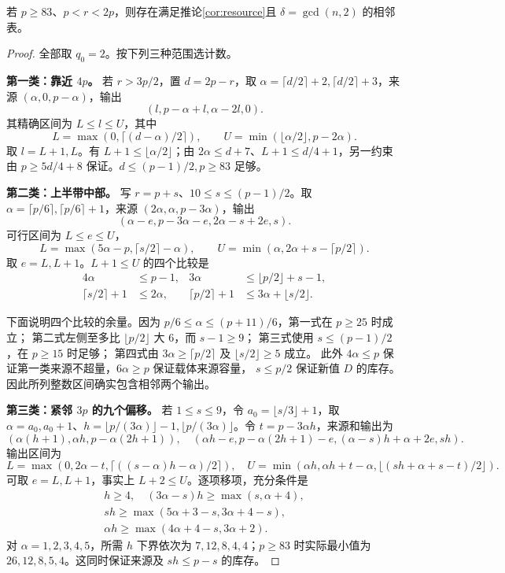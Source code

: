 \begin{lemma}[大素数的三组计数公式]\label{lem:upper-supply}
若 $p\ge83$、$p<r<2p$，则存在满足推论\ref{cor:resource}且 $\delta=\gcd(n,2)$ 的相邻表。
\end{lemma}
\begin{proof}
全部取 $q_0=2$。按下列三种范围选计数。

\par\noindent\textbf{第一类：靠近 $4p$。} 若 $r>3p/2$，置 $d=2p-r$，取 $\alpha=\lceil d/2\rceil+2,\lceil d/2\rceil+3$，来源 $(\alpha,0,p-\alpha)$，输出
\[(l,p-\alpha+l,\alpha-2l,0).
\]
其精确区间为 $L\le l\le U$，其中
\[L=\max(0,\lceil(d-\alpha)/2\rceil),\qquad
U=\min(\lfloor\alpha/2\rfloor,p-2\alpha).
\]
取 $l=L+1,L$。有 $L+1\le\lfloor\alpha/2\rfloor$；由 $2\alpha\le d+7$、$L+1\le d/4+1$，另一约束由 $p\ge5d/4+8$ 保证。$d\le(p-1)/2,p\ge83$ 足够。

\par\noindent\textbf{第二类：上半带中部。} 写 $r=p+s$、$10\le s\le(p-1)/2$。取 $\alpha=\lceil p/6\rceil,\lceil p/6\rceil+1$，来源 $(2\alpha,\alpha,p-3\alpha)$，输出
\[(\alpha-e,p-3\alpha-e,2\alpha-s+2e,s).
\]
可行区间为 $L\le e\le U$，
\[L=\max(5\alpha-p,\lceil s/2\rceil-\alpha),\qquad
U=\min(\alpha,2\alpha+s-\lceil p/2\rceil).
\]
取 $e=L,L+1$。$L+1\le U$ 的四个比较是
\begin{align*}
4\alpha&\le p-1,&3\alpha&\le\lfloor p/2\rfloor+s-1,\\
\lceil s/2\rceil+1&\le2\alpha,&\lceil p/2\rceil+1&\le3\alpha+\lfloor s/2\rfloor.
\end{align*}

下面说明四个比较的余量。因为 $p/6\le\alpha\le(p+11)/6$，第一式在 $p\ge25$ 时成立；
第二式左侧至多比 $\lfloor p/2\rfloor$ 大 $6$，而 $s-1\ge9$；
第三式使用 $s\le(p-1)/2$，在 $p\ge15$ 时足够；
第四式由 $3\alpha\ge\lceil p/2\rceil$ 及 $\lfloor s/2\rfloor\ge5$ 成立。
此外 $4\alpha\le p$ 保证第一类来源不超量，$6\alpha\ge p$ 保证载体来源容量，
$s\le p/2$ 保证新值 $D$ 的库存。因此所列整数区间确实包含相邻两个输出。

\par\noindent\textbf{第三类：紧邻 $3p$ 的九个偏移。} 若 $1\le s\le9$，令 $a_0=\lfloor s/3\rfloor+1$，取 $\alpha=a_0,a_0+1$、$h=\lfloor p/(3\alpha)\rfloor-1,\lfloor p/(3\alpha)\rfloor$。令 $t=p-3\alpha h$，来源和输出为
\[
(\alpha(h+1),\alpha h,p-\alpha(2h+1)),\quad
(\alpha h-e,p-\alpha(2h+1)-e,(\alpha-s)h+\alpha+2e,sh).
\]
输出区间为
\[
L=\max(0,2\alpha-t,\lceil((s-\alpha)h-\alpha)/2\rceil),\quad
U=\min(\alpha h,\alpha h+t-\alpha,\lfloor(sh+\alpha+s-t)/2\rfloor).
\]
可取 $e=L,L+1$，事实上 $L+2\le U$。逐项移项，充分条件是
\[
\begin{gathered}
h\ge4,\quad(3\alpha-s)h\ge\max(s,\alpha+4),\\
sh\ge\max(5\alpha+3-s,3\alpha+4-s),\\
\alpha h\ge\max(4\alpha+4-s,3\alpha+2).
\end{gathered}
\]
对 $\alpha=1,2,3,4,5$，所需 $h$ 下界依次为 $7,12,8,4,4$；$p\ge83$ 时实际最小值为 $26,12,8,5,4$。这同时保证来源及 $sh\le p-s$ 的库存。



\end{proof}
